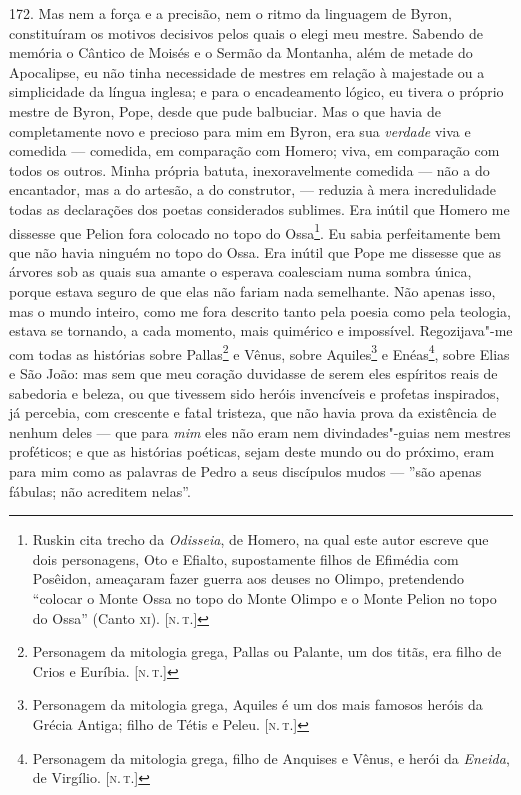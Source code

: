 172. Mas nem a força e a precisão, nem o ritmo da linguagem de Byron,
constituíram os motivos decisivos pelos quais o elegi meu mestre.
Sabendo de memória o Cântico de Moisés e o Sermão da Montanha, além de
metade do Apocalipse, eu não tinha necessidade de mestres em relação à
majestade ou a simplicidade da língua inglesa; e para o encadeamento
lógico, eu tivera o próprio mestre de Byron, Pope, desde que pude
balbuciar. Mas o que havia de completamente novo e precioso para mim em
Byron, era sua \emph{verdade} viva e comedida --- comedida, em comparação
com Homero; viva, em comparação com todos os outros. Minha própria
batuta, inexoravelmente comedida --- não a do encantador, mas a do
artesão, a do construtor, --- reduzia à mera incredulidade todas as
declarações dos poetas considerados sublimes. Era inútil que Homero me
dissesse que Pelion fora colocado no topo do Ossa\footnote{Ruskin cita
  trecho da \emph{Odisseia}, de Homero, na qual este autor escreve
  que dois personagens, Oto e Efialto, supostamente filhos de Efimédia com
  Posêidon, ameaçaram fazer guerra aos deuses no Olimpo, pretendendo
  ``colocar o Monte Ossa no topo do Monte Olimpo e o Monte Pelion no
  topo do Ossa'' (Canto \textsc{xi}). {[}\textsc{n.\,t.}{]}}. Eu sabia perfeitamente bem
que não havia ninguém no topo do Ossa. Era inútil que Pope me dissesse
que as árvores sob as quais sua amante o esperava coalesciam numa sombra
única, porque estava seguro de que elas não fariam nada semelhante. Não
apenas isso, mas o mundo inteiro, como me fora descrito tanto pela
poesia como pela teologia, estava se tornando, a cada momento, mais
quimérico e impossível. Regozijava"-me com todas as histórias sobre
Pallas\footnote{Personagem da mitologia grega, Pallas ou Palante, um dos
  titãs, era filho de Crios e Euríbia. {[}\textsc{n.\,t.}{]}} e Vênus, sobre
Aquiles\footnote{Personagem da mitologia grega, Aquiles é um dos mais
  famosos heróis da Grécia Antiga; filho de Tétis e Peleu. {[}\textsc{n.\,t.}{]}} e Enéas\footnote{Personagem da mitologia grega, filho de
  Anquises e Vênus, e herói da \emph{Eneida}, de Virgílio. {[}\textsc{n.\,t.}{]}}, sobre Elias e São João: mas sem que meu coração duvidasse de
serem eles espíritos reais de sabedoria e beleza, ou que tivessem sido
heróis invencíveis e profetas inspirados, já percebia, com crescente e
fatal tristeza, que não havia prova da existência de nenhum deles --- que
para \emph{mim} eles não eram nem divindades"-guias nem mestres
proféticos; e que as histórias poéticas, sejam deste mundo ou do
próximo, eram para mim como as palavras de Pedro a seus discípulos mudos
--- ''são apenas fábulas; não acreditem nelas''.

